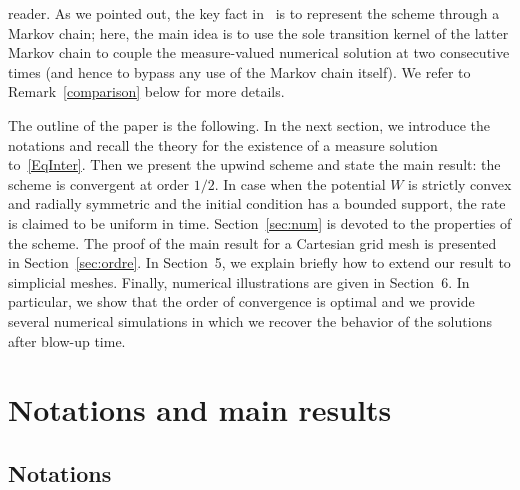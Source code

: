 \documentclass[11pt]{article}
\theoremstyle{definition}
\numberwithin{equation}{section}
\begin{document}
reader. As we pointed out, the key fact in~\cite{DLV} is to represent the scheme through a Markov chain; here, the main idea is to use the sole transition kernel of the latter Markov chain to couple the measure-valued numerical solution at two consecutive times (and hence to bypass any use of the Markov chain itself). We refer to Remark~\ref{comparison} below for more details.

The outline of the paper is the following. In the next section, we introduce the notations and recall the theory for the existence of a measure solution to~\eqref{EqInter}. Then we present the upwind scheme and state the main result: the scheme is convergent at order $1/2$. In case when the potential $W$ is strictly convex and radially symmetric and the initial condition has a bounded support, the rate is claimed to be uniform in time. Section~\ref{sec:num} is devoted to the properties of the scheme. The proof of the main result for a Cartesian grid mesh is presented in Section~\ref{sec:ordre}. In Section~5, we explain briefly how to extend our result to simplicial meshes. Finally, numerical illustrations are given in Section~6. In particular, we show that the order of convergence is optimal and we provide several numerical simulations in which we recover the behavior of the solutions after blow-up time.



\section{Notations and main results}


\subsection{Notations}
\end{document}
